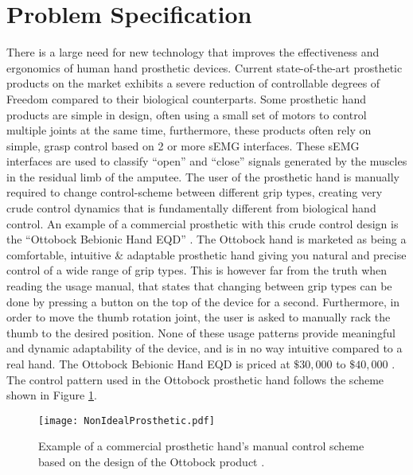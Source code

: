 \documentclass[../main.tex]{subfiles}
\begin{document}
\section{Problem Specification}

There is a large need for new technology that improves the effectiveness and ergonomics of human hand prosthetic devices.
Current state-of-the-art prosthetic products on the market exhibits a severe reduction of controllable degrees of Freedom compared to their biological counterparts.
Some prosthetic hand products are simple in design, often using a small set of motors to control multiple joints at the same time, furthermore, these products often rely on simple, grasp control based on 2 or more \gls{sEMG} interfaces.
These \gls{sEMG} interfaces are used to classify ``open'' and ``close'' signals generated by the muscles in the residual limb of the amputee.
The user of the prosthetic hand is manually required to change control-scheme between different grip types, creating very crude control dynamics that is fundamentally different from biological hand control.
An example of a commercial prosthetic with this crude control design is the ``Ottobock Bebionic Hand EQD'' \cite{ottobock}.
The Ottobock hand is marketed as being a comfortable, intuitive \& adaptable prosthetic hand giving you natural and precise control of a wide range of grip types.
This is however far from the truth when reading the usage manual, that states that changing between grip types can be done by pressing a button on the top of the device for a second.
Furthermore, in order to move the thumb rotation joint, the user is asked to manually rack the thumb to the desired position.
None of these usage patterns provide meaningful and dynamic adaptability of the device, and is in no way intuitive compared to a real hand.
The Ottobock Bebionic Hand EQD is priced at $\$30,000$ to $\$40,000$ \cite{ottobock-prices}.
The control pattern used in the Ottobock prosthetic hand follows the scheme shown in Figure \ref{fig:nonidealprosthetic}.

\begin{figure}[H]
\begin{center}
\texttt{[image: NonIdealProsthetic.pdf]}
\caption{Example of a commercial prosthetic hand's manual control scheme based on the design of the Ottobock product \cite{ottobock}.}
\label{fig:nonidealprosthetic}
\end{center}
\end{figure}
\end{document}
